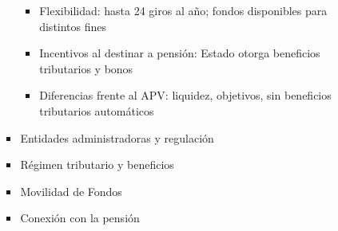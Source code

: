 \begin{enumerate}
\begin{enumerate}
\begin{itemize}
\begin{itemize}
            \item Flexibilidad: hasta 24 giros al año; fondos disponibles para distintos fines 
            \item Incentivos al destinar a pensión: Estado otorga beneficios tributarios y bonos
            \item Diferencias frente al APV: liquidez, objetivos, sin beneficios tributarios automáticos
        \end{itemize}
        \item Entidades administradoras y regulación
        \item Régimen tributario y beneficios
        \item Movilidad de Fondos
        \item Conexión con la pensión 
    \end{itemize}
\end{enumerate}
\end{enumerate}
